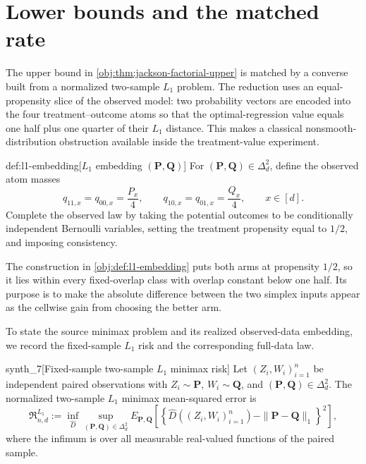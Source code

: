 \section{Lower bounds and the matched rate}

The upper bound in \cref{obj:thm:jackson-factorial-upper} is matched by a converse built from a normalized two-sample \(L_1\) problem. The reduction uses an equal-propensity slice of the observed model: two probability vectors are encoded into the four treatment--outcome atoms so that the optimal-regression value equals one half plus one quarter of their \(L_1\) distance. This makes a classical nonsmooth-distribution obstruction available inside the treatment-value experiment.

\begin{definitionv}{def:l1-embedding}[\(L_1\) embedding \((\mathbf P,\mathbf Q)\)]
For \((\mathbf P,\mathbf Q)\in\Delta_d^2\), define the observed atom masses
\[
q_{11,x}=q_{00,x}=\frac{P_x}{4},
\qquad
q_{10,x}=q_{01,x}=\frac{Q_x}{4},
\qquad x\in[d].
\]
Complete the observed law by taking the potential outcomes to be conditionally independent Bernoulli variables, setting the treatment propensity equal to \(1/2\), and imposing consistency.
\end{definitionv}

The construction in \cref{obj:def:l1-embedding} puts both arms at propensity \(1/2\), so it lies within every fixed-overlap class with overlap constant below one half. Its purpose is to make the absolute difference between the two simplex inputs appear as the cellwise gain from choosing the better arm.

To state the source minimax problem and its realized observed-data embedding, we record the fixed-sample \(L_1\) risk and the corresponding full-data law.

\begin{definitionv}{synth_7}[Fixed-sample two-sample \(L_1\) minimax risk]
Let \((Z_i,W_i)_{i=1}^n\) be independent paired observations with \(Z_i\sim\mathbf P\), \(W_i\sim\mathbf Q\), and \((\mathbf P,\mathbf Q)\in\Delta_d^2\). The normalized two-sample \(L_1\) minimax mean-squared error is \[ \mathfrak R^{L_1}_{n,d}:=\inf_{\widehat D}\sup_{(\mathbf P,\mathbf Q)\in\Delta_d^2}E_{\mathbf P,\mathbf Q}\left[\left\{\widehat D((Z_i,W_i)_{i=1}^n)-\|\mathbf P-\mathbf Q\|_1\right\}^2\right], \] where the infimum is over all measurable real-valued functions of the paired sample.
\end{definitionv}

